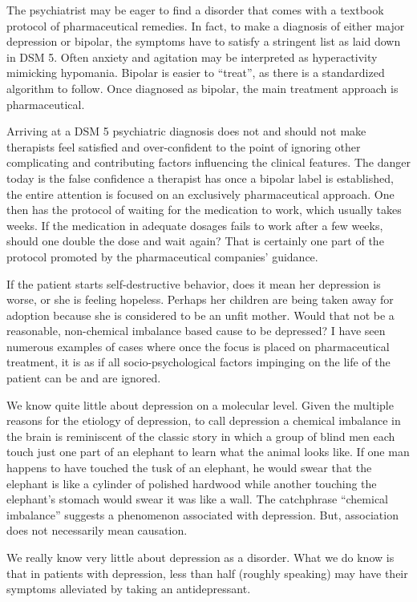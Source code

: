 \documentclass[]{book}
\begin{document}
The psychiatrist may be eager to find a disorder that comes with a textbook protocol of pharmaceutical remedies. In fact, to make a diagnosis of either major depression or bipolar, the symptoms have to satisfy a stringent list as laid down in DSM 5. Often anxiety and agitation may be interpreted as hyperactivity mimicking hypomania. Bipolar is easier to ``treat'', as there is a standardized algorithm to follow. Once diagnosed as bipolar, the main treatment approach is pharmaceutical.

Arriving at a DSM 5 psychiatric diagnosis does not and should not make therapists feel satisfied and over-confident to the point of ignoring other complicating and contributing factors influencing the clinical features. The danger today is the false confidence a therapist has once a bipolar label is established, the entire attention is focused on an exclusively pharmaceutical approach. One then has the protocol of waiting for the medication to work, which usually takes weeks. If the medication in adequate dosages fails to work after a few weeks, should one double the dose and wait again? That is certainly one part of the protocol promoted by the pharmaceutical companies' guidance.

If the patient starts self-destructive behavior, does it mean her depression is worse, or she is feeling hopeless. Perhaps her children are being taken away for adoption because she is considered to be an unfit mother. Would that not be a reasonable, non-chemical imbalance based cause to be depressed? I have seen numerous examples of cases where once the focus is placed on pharmaceutical treatment, it is as if all socio-psychological factors impinging on the life of the patient can be and are ignored.

We know quite little about depression on a molecular level. Given the multiple reasons for the etiology of depression, to call depression a chemical imbalance in the brain is reminiscent of the classic story in which a group of blind men each touch just one part of an elephant to learn what the animal looks like. If one man happens to have touched the tusk of an elephant, he would swear that the elephant is like a cylinder of polished hardwood while another touching the elephant's stomach would swear it was like a wall. The catchphrase ``chemical imbalance'' suggests a phenomenon associated with depression. But, association does not necessarily mean causation.

We really know very little about depression as a disorder. What we do know is that in patients with depression, less than half (roughly speaking) may have their symptoms alleviated by taking an antidepressant.
\end{document}
